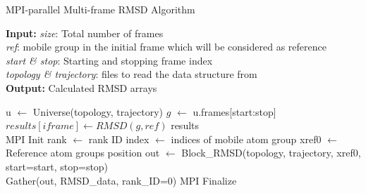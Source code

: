 \begin{algorithm}[ht!]
	\scriptsize
	\caption{MPI-parallel Multi-frame RMSD Algorithm}
	\label{alg:RMSD}
	\hspace*{\algorithmicindent} \textbf{Input:} \emph{size}: Total number of frames \\
	\hspace*{\algorithmicindent} \emph{ref}: mobile group in the initial frame which will be considered as reference \\
	\hspace*{\algorithmicindent} \emph{start \& stop}: Starting and stopping frame index\\
	\hspace*{\algorithmicindent} \emph{topology \& trajectory}: files to read the data structure from \\
	\hspace*{\algorithmicindent} \textbf{Output:} Calculated RMSD arrays
	\begin{algorithmic}[1]
		\State u $\leftarrow$ Universe(topology, trajectory)
		\State $g$ $\leftarrow$ u.frames[start:stop]
		\State $results[iframe] \leftarrow RMSD(g, ref)$
		\EndFor
		\State \Return results
		\EndProcedure
		\\        
		\State MPI Init
		\State rank $\leftarrow$ rank ID
		\State index $\leftarrow$ indices of mobile atom group
		\State xref0 $\leftarrow$ Reference atom group\textsc{}s position
		\State out $\leftarrow$ Block\_RMSD(topology, trajectory, xref0, start=start, stop=stop)
		\\
		\State Gather(out, RMSD\_data, rank\_ID=0)
		\State MPI Finalize
	\end{algorithmic}
\end{algorithm}

